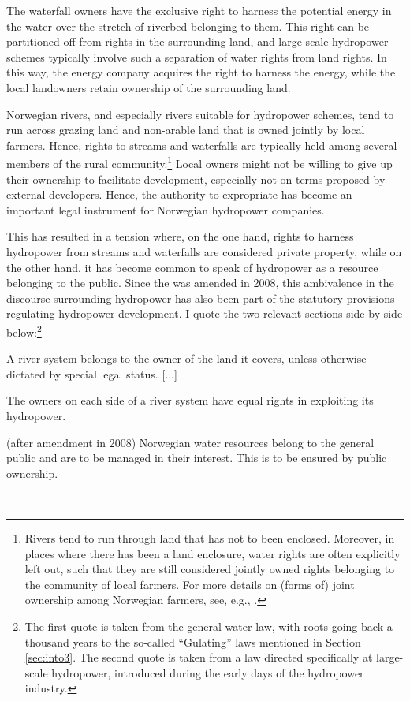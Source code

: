The waterfall owners have the exclusive right to harness the potential energy in the water over the stretch of riverbed belonging to them. This right can be partitioned off from rights in the surrounding land, and large-scale hydropower schemes typically involve such a separation of water rights from land rights. In this way, the energy company acquires the right to harness the energy, while the local landowners retain ownership of the surrounding land.

Norwegian rivers, and especially rivers suitable for hydropower schemes, tend to run across grazing land and non-arable land that is owned jointly by local farmers. Hence, rights to streams and waterfalls are typically held among several members of the rural community.\footnote{Rivers tend to run through land that has not to been enclosed. Moreover, in places where there has been a land enclosure, water rights are often explicitly left out, such that they are still considered jointly owned rights belonging to the community of local farmers. For more details on (forms of) joint ownership among Norwegian farmers, see, e.g., \cite[570]{stenseth07}.} Local owners might not be willing to give up their ownership to facilitate development, especially not on terms proposed by external developers. Hence, the authority to expropriate has become an important legal instrument for Norwegian hydropower companies.

This has resulted in a tension where, on the one hand, rights to harness hydropower from streams and waterfalls are considered private property, while on the other hand, it has become common to speak of hydropower as a resource belonging to the public. Since the \cite{ica17} was amended in 2008, this ambivalence in the discourse surrounding hydropower has also been part of the statutory provisions regulating hydropower development. I quote the two relevant sections side by side below:\footnote{The first quote is taken from the general water law, with roots going back a thousand years to the so-called ``Gulating'' laws mentioned in Section \ref{sec:into3}. The second quote is taken from a law directed specifically at large-scale hydropower, introduced during the early days of the hydropower industry.}

{\begin{minipage}[t]{16em}
 \begin{aquote}{\tiny \cite[13]{wra00}} \footnotesize A river system belongs to the owner of the land it covers, unless otherwise dictated by special legal status. [...]

The owners on each side of a river system have equal rights in exploiting its hydropower.
\end{aquote}  
\end{minipage}}
{\begin{minipage}[t]{22em}
\begin{aquote}{\tiny \cite[1]{ica17} (after amendment in 2008)} \footnotesize Norwegian water resources belong to the general public and are to be managed in their interest. This is to be ensured by public ownership.
\end{aquote}
\end{minipage}} \\

